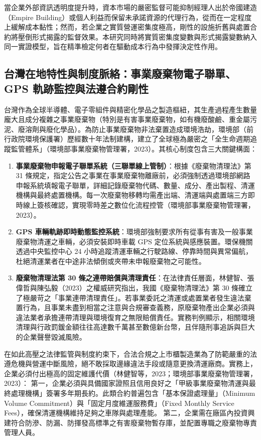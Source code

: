 \documentclass[12pt,a4paper]{article}
\begin{document}
當企業外部資訊透明度提升時，資本市場的嚴密監督可能抑制經理人出於帝國建造（Empire Building）或個人利益而保留未承諾資源的代理行為，從而在一定程度上緩解成本黏性；然而，若企業之實質營運密集度極高，剛性的設施折舊與處置合約將壓倒形式揭露的監督效果。本研究同時將實質密集度變數與形式揭露變數納入同一實證模型，旨在精準檢定何者在驅動成本行為中發揮決定性作用。

\subsection{台灣在地特性與制度脈絡：事業廢棄物電子聯單、GPS 軌跡監控與法遵合約剛性}

台灣作為全球半導體、電子零組件與精密化學品之製造樞紐，其生產過程產生數量龐大且成分複雜之事業廢棄物（特別是有害事業廢棄物，如有機廢酸鹼、重金屬污泥、廢溶劑與廢化學品）。為防止事業廢棄物非法棄置造成環境浩劫，環境部（前行政院環境保護署）歷經數十年法制建構，建立了全球極為嚴密之「全生命週期追蹤監管體系」（環境部事業廢棄物管理署，2023）。其核心制度包含三大關鍵構面：

\begin{enumerate}[leftmargin=*]
    \item \textbf{事業廢棄物申報電子聯單系統（三聯單線上管制）}：根據《廢棄物清理法》第 31 條規定，指定公告之事業在事業廢棄物離廠前，必須強制透過環境部網路申報系統填報電子聯單，詳細記錄廢棄物代碼、數量、成分、產出製程、清運機構與最終處置機構。每一次廢棄物移轉均需產出端、清運端與處置端三方即時線上簽核確認，實現零時差之數位化流程控管（環境部事業廢棄物管理署，2023）。
    \item \textbf{GPS 車輛軌跡即時動態監控系統}：環境部強制要求所有從事有害及一般事業廢棄物清運之車輛，必須安裝即時車載 GPS 定位系統與感應裝置。環保機關透過中央監控中心 24 小時追蹤清運車輛之行駛路線、停靠時間與異常偏航，杜絕清運業者在中途非法傾倒或夾帶未申報廢棄物之可能性。
    \item \textbf{廢棄物清理法第 30 條之連帶賠償與清理責任}：在法律責任層面，林健智、張偉哲與陳弘毅（2023）之權威研究指出，我國《廢棄物清理法》第 30 條確立了極嚴苛之「事業連帶清理責任」。若事業委託之清運或處置業者發生違法棄置行為，且事業未盡到相當之注意與合規審查義務，原廢棄物產出企業必須與違法業者承擔連帶清理與環境復育之無限賠償責任。實務判例顯示，相關環境清理與行政罰鍰金額往往高達數千萬甚至數億新台幣，且伴隨刑事追訴與巨大的企業聲譽毀滅風險。
\end{enumerate}

在如此高壓之法律監管與制度約束下，合法合規之上市櫃製造業為了防範嚴重的法遵危機與營運中斷風險，絕不敢採取邊緣違法手段或隨意更換清運廠商。實務上，企業必須付出極高的固定維護代價（林健智等，2023；環境部事業廢棄物管理署，2023）：
第一，企業必須與具備國家證照且信用良好之「甲級事業廢棄物清運與最終處理機構」簽署多年期長約。此類合約普遍包含「基本保證處理量」（Minimum Volume Commitment）與「固定月度維運服務費」（Fixed Monthly Service Fees），確保清運機構維持足夠之車隊與處理產能。
第二，企業需在廠區內投資興建符合防滲、防漏、防揮發高標準之有害廢棄物暫存庫，並配置專職之廢棄物專責管理人員。
\end{document}
